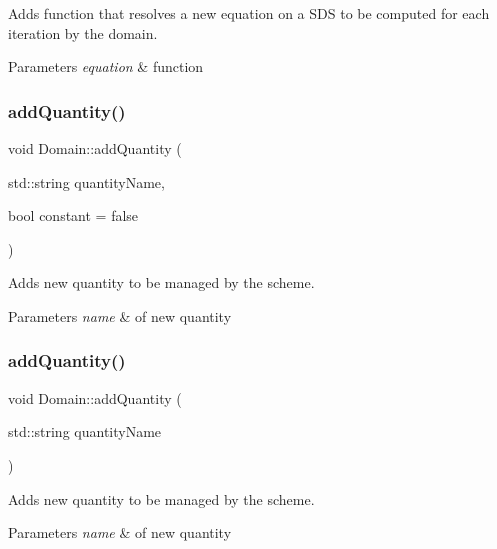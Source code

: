 Adds function that resolves a new equation on a S\+DS to be computed for each iteration by the domain. 


\begin{DoxyParams}{Parameters}
{\em equation} & function \\
\hline
\end{DoxyParams}
\mbox{\label{classDomain_a4bad9ce1ce7d7fc7ef5b564bd5ac21e1}} 
\subsubsection{\texorpdfstring{add\+Quantity()}{addQuantity()}\hspace{0.1cm}{\footnotesize\ttfamily [1/2]}}
{\footnotesize\ttfamily void Domain\+::add\+Quantity (\begin{DoxyParamCaption}\item[{std\+::string}]{quantity\+Name,  }\item[{bool}]{constant = {\ttfamily false} }\end{DoxyParamCaption})}



Adds new quantity to be managed by the scheme. 


\begin{DoxyParams}{Parameters}
{\em name} & of new quantity \\
\hline
\end{DoxyParams}
\mbox{\label{classDomain_a9c33ac08523c95967ad2a51c59fd8d96}} 
\subsubsection{\texorpdfstring{add\+Quantity()}{addQuantity()}\hspace{0.1cm}{\footnotesize\ttfamily [2/2]}}
{\footnotesize\ttfamily void Domain\+::add\+Quantity (\begin{DoxyParamCaption}\item[{std\+::string}]{quantity\+Name }\end{DoxyParamCaption})}



Adds new quantity to be managed by the scheme. 


\begin{DoxyParams}{Parameters}
{\em name} & of new quantity \\
\hline
\end{DoxyParams}
\mbox{\label{classDomain_a29537b651bacd922cae449357969d900}} 
